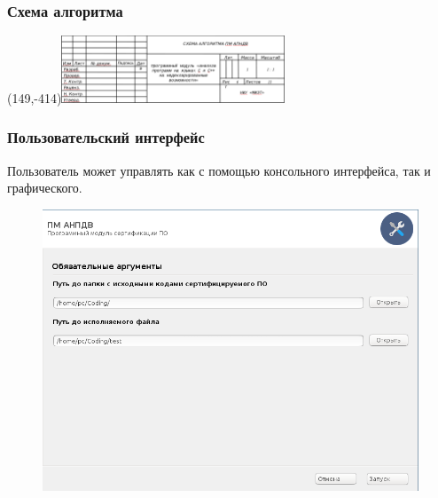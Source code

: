 \begin{frame}%
\frametitle{Схема алгоритма {\ProgModule}}

    \Put(149,-414){\includegraphics[height=2cm]{Presentation/images/algo_gost.png}}

    \begin{figure}[!htbp]
        \vspace{-9ex} 
        \hspace{-13cm} 
        \begin{adjustbox}{max totalsize={1.6\textwidth}{1.6\textheight},left}
            
        \end{adjustbox}
    \end{figure}
\end{frame}

\begin{frame}%
\frametitle{Пользовательский интерфейс {\ProgModule}}
    Пользователь может управлять {\ProgModule} как с помощью
    консольного интерфейса, так и графического.
    \begin{figure}[!htbp]
        \begin{adjustbox}{max totalsize={0.8\textwidth}{0.8\textheight}}
            \includegraphics[trim={0.2em 0.2ex 0.2ex 0.2ex},clip,width=\linewidth]{images/apndv-gui.png}
        \end{adjustbox}
    \end{figure}

\end{frame}

